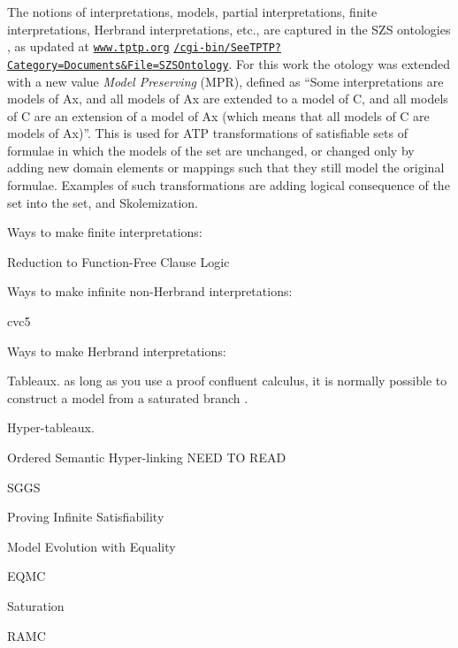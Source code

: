 \documentclass{easychair}
\newenvironment{packed_itemize}{
\vspace*{-0.2em}
\begin{itemize}
\setlength{\partopsep}{0pt}
\setlength{\itemsep}{1pt}
\setlength{\parskip}{0pt}
\setlength{\parsep}{0pt}
}{\end{itemize}}
\begin{document}
The notions of interpretations, models, partial interpretations, finite interpretations,
Herbrand interpretations, etc., are captured in the SZS ontologies \cite{Sut08-KEAPPA}, as
updated at 
\href{https://www.tptp.org/cgi-bin/SeeTPTP?Category=Documents\&File=SZSOntology}{\tt www.tptp.org}
\href{https://www.tptp.org/cgi-bin/SeeTPTP?Category=Documents\&File=SZSOntology}{\tt /cgi-bin/SeeTPTP?Category=Documents\&File=SZSOntology}.
For this work the otology was extended with a new value {\em Model Preserving} (MPR), defined
as ``Some interpretations are models of Ax, and
  all models of Ax are extended to a model of C, and
  all models of C are an extension of a model of Ax
  (which means that all models of C are models of Ax)''.
This is used for ATP transformations of satisfiable sets of formulae in which the models
of the set are unchanged, or changed only by adding new domain elements or mappings such
that they still model the original formulae.
Examples of such transformations are adding logical consequence of the set into the set, and
Skolemization.

Ways to make finite interpretations:
\begin{packed_itemize}
\item Reduction to Function-Free Clause Logic \cite{CS03,McC03-MACE4-TR,BF+09}
\end{packed_itemize}

Ways to make infinite non-Herbrand interpretations:
\begin{packed_itemize}
\item cvc5
\end{packed_itemize}

Ways to make Herbrand interpretations:
\begin{packed_itemize}
\item Tableaux. as long as you use a proof confluent calculus, it is normally possible to 
      construct a model from a saturated branch \cite{Hah01}.
\item Hyper-tableaux. \cite{BFN96,Bau98,BFP07}
\item Ordered Semantic Hyper-linking \cite{PZ00} NEED TO READ
\item SGGS \cite{BP16}
\item Proving Infinite Satisfiability \cite{BB13}
\item Model Evolution with Equality \cite{BT03,BFT04,BT05,BPT11}
\item EQMC \cite{CP00,Pel03-EQMC}
\item Saturation \cite{Pel03-JSC}
\item RAMC \cite{CZ92,CP95,CP95-TAB}
\end{packed_itemize}
\end{document}

